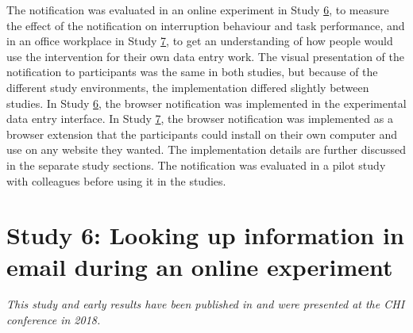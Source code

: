 The notification was evaluated in an online experiment in Study \hyperref[st:Study6]{6}, to measure the effect of the notification on interruption behaviour and task performance, and in an office workplace in Study \hyperref[st:Study7]{7}, to get an understanding of how people would use the intervention for their own data entry work. The visual presentation of the notification to participants was the same in both studies, but because of the different study environments, the implementation differed slightly between studies. In Study \hyperref[st:Study6]{6}, the browser notification was implemented in the experimental data entry interface. In Study \hyperref[st:Study7]{7}, the browser notification was implemented as a browser extension that the participants could install on their own computer and use on any website they wanted. The implementation details are further discussed in the separate study sections. The notification was evaluated in a pilot study with colleagues before using it in the studies. 



\section{Study 6: Looking up information in email during an online experiment}\label{st:Study6}
\textit{This study and early results have been published in \citet{Borghouts2018a} and were presented at the CHI conference in 2018.}

